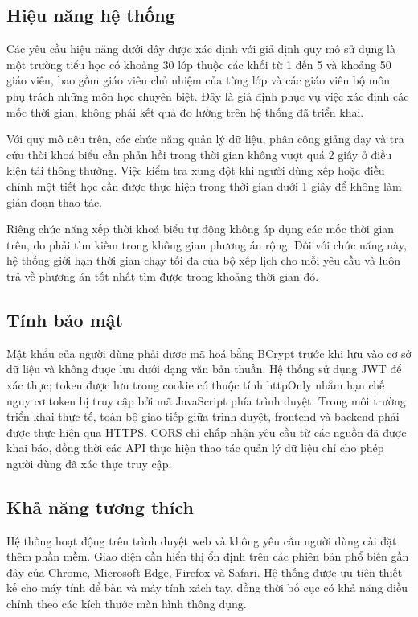 \documentclass[../DoAn.tex]{subfiles}
\begin{document}
\subsection{Hiệu năng hệ thống}

Các yêu cầu hiệu năng dưới đây được xác định với giả định quy mô sử dụng là một
trường tiểu học có khoảng 30 lớp thuộc các khối từ 1 đến 5 và khoảng 50 giáo
viên, bao gồm giáo viên chủ nhiệm của từng lớp và các giáo viên bộ môn phụ trách
những môn học chuyên biệt. Đây là giả định phục vụ việc xác định các mốc thời
gian, không phải kết quả đo lường trên hệ thống đã triển khai.

Với quy mô nêu trên, các chức năng quản lý dữ liệu, phân công giảng dạy và tra
cứu thời khoá biểu cần phản hồi trong thời gian không vượt quá 2 giây ở điều
kiện tải thông thường. Việc kiểm tra xung đột khi người dùng xếp hoặc điều chỉnh
một tiết học cần được thực hiện trong thời gian dưới 1 giây để không làm gián
đoạn thao tác.

Riêng chức năng xếp thời khoá biểu tự động không áp dụng các mốc thời gian trên,
do phải tìm kiếm trong không gian phương án rộng. Đối với chức năng này, hệ
thống giới hạn thời gian chạy tối đa của bộ xếp lịch cho mỗi yêu cầu và luôn trả
về phương án tốt nhất tìm được trong khoảng thời gian đó.

\subsection{Tính bảo mật}

Mật khẩu của người dùng phải được mã hoá bằng BCrypt trước khi lưu vào cơ sở
dữ liệu và không được lưu dưới dạng văn bản thuần. Hệ thống sử dụng JWT để
xác thực; token được lưu trong cookie có thuộc tính httpOnly nhằm hạn
chế nguy cơ token bị truy cập bởi mã JavaScript phía trình duyệt. Trong môi
trường triển khai thực tế, toàn bộ giao tiếp giữa trình duyệt, frontend và backend
phải được thực hiện qua HTTPS. CORS chỉ chấp nhận yêu cầu từ các nguồn đã
được khai báo, đồng thời các API thực hiện thao tác quản lý dữ liệu chỉ cho phép
người dùng đã xác thực truy cập.

\subsection{Khả năng tương thích}

Hệ thống hoạt động trên trình duyệt web và không yêu cầu người dùng cài đặt
thêm phần mềm. Giao diện cần hiển thị ổn định trên các phiên bản phổ biến gần
đây của Chrome, Microsoft Edge, Firefox và Safari. Hệ thống được ưu tiên thiết
kế cho máy tính để bàn và máy tính xách tay, đồng thời bố cục có khả năng điều
chỉnh theo các kích thước màn hình thông dụng.
\end{document}
